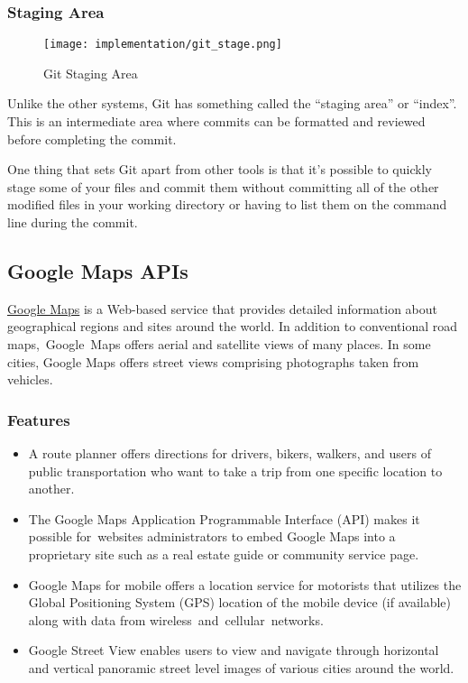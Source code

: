 	\subsubsection{Staging Area}
			\begin{wrapfigure}{r}{0.25\textwidth}
				\texttt{[image: implementation/git\_stage.png]}
				\caption{Git Staging Area}
			\end{wrapfigure}
		Unlike the other systems, Git has something called the ``staging area'' or ``index''. This is an intermediate area where commits can be formatted and reviewed before completing the commit.
		
		One thing that sets Git apart from other tools is that it's possible to quickly stage some of your files and commit them without committing all of the other modified files in your working directory or having to list them on the command line during the commit.
		
\subsection{Google Maps APIs}
	\href{https://developers.google.com/maps/}{Google Maps} is a Web-based service that provides detailed information about geographical regions and sites around the world. In addition to conventional road maps, Google Maps offers aerial and satellite views of many places. In some cities, Google Maps offers street views comprising photographs taken from vehicles.\cite{google_maps}
	\subsubsection{Features}
		\begin{itemize}
			\item A route planner offers directions for drivers, bikers, walkers, and users of public transportation who want to take a trip from one specific location to another.
			\item The Google Maps Application Programmable Interface (API) makes it possible for websites administrators to embed Google Maps into a proprietary site such as a real estate guide or community service page.
			\item Google Maps for mobile offers a location service for motorists that utilizes the Global Positioning System (GPS) location of the mobile device (if available) along with data from wireless and cellular networks.
			\item Google Street View enables users to view and navigate through horizontal and vertical panoramic street level images of various cities around the world.
		\end{itemize}